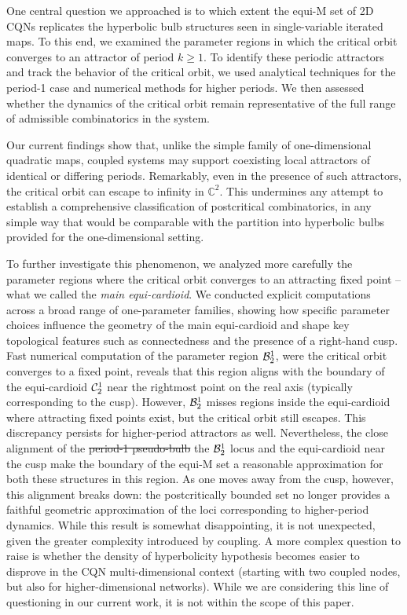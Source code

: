 \documentclass[10pt]{article}
\begin{document}
One central question we approached is to which extent the equi-M set of 2D CQNs replicates the hyperbolic bulb structures seen in single-variable iterated maps. To this end, we examined the parameter regions in which the critical orbit converges to an attractor of period
$k \geq 1$. To identify these periodic attractors and track the behavior of the critical orbit, we used analytical techniques for the period-1 case and numerical methods for higher periods. We then assessed whether the dynamics of the critical orbit remain representative of the full range of admissible combinatorics in the system.

Our current findings show that, unlike the simple family of one-dimensional quadratic maps, coupled systems may support coexisting local attractors of identical or differing periods. Remarkably, even in the presence of such attractors, the critical orbit can escape to infinity in $\mathbb{C}^2$. This undermines any attempt to establish a comprehensive classification of postcritical combinatorics, in any simple way that would be comparable with the partition into hyperbolic bulbs provided for the one-dimensional setting.

To further investigate this phenomenon, we analyzed more carefully the parameter regions where the critical orbit converges to an attracting fixed point -- what we called the {\it main equi-cardioid}. We conducted explicit computations across a broad range of one-parameter families, showing how specific parameter choices influence the geometry of the main equi-cardioid and shape key topological features such as connectedness and the presence of a right-hand cusp. Fast numerical computation of the parameter region ${\cal B}_2^1$, were the critical orbit converges to a fixed point, reveals that this region aligns with the boundary of the equi-cardioid ${\cal C}_2^1$ near the rightmost point on the real axis (typically corresponding to the cusp). However, ${\cal B}_2^1$ misses regions inside the equi-cardioid where attracting fixed points exist, but the critical orbit still escapes. This discrepancy persists for higher-period attractors as well. Nevertheless, the close alignment of the \sout{period-1 pseudo-bulb} the ${\cal B}_2^1$ locus and the equi-cardioid near the cusp make the boundary of the equi-M set a reasonable approximation for both these structures in this region. As one moves away from the cusp, however, this alignment breaks down: the postcritically bounded set no longer provides a faithful geometric approximation of the loci corresponding to higher-period dynamics. While this result is somewhat disappointing, it is not unexpected, given the greater complexity introduced by coupling. A more complex question to raise is whether the density of hyperbolicity hypothesis becomes easier to disprove in the CQN multi-dimensional context (starting with two coupled nodes, but also for higher-dimensional networks). While we are considering this line of questioning in our current work, it is not within the scope of this paper.
\end{document}
